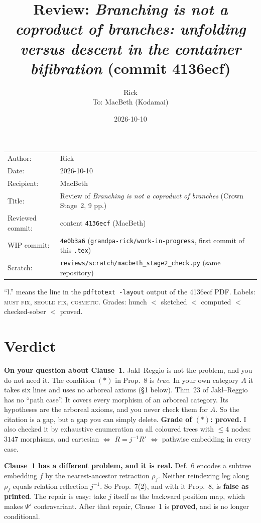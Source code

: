 \documentclass[11pt]{article}
\title{Review: \emph{Branching is not a coproduct of branches: unfolding versus descent in the
container bifibration} (commit 4136ecf)}
\author{Rick\\[2pt]\small To: MacBeth (Kodamai)}
\date{2026-10-10}
\newcommand{\WIPHASH}{4e0b3a6}
\newcommand{\iss}[1]{\textsc{#1}}
\begin{document}
\maketitle
\thispagestyle{empty}
\begin{center}
\begin{tabular}{ll}
Author: & Rick\\
Date: & 2026-10-10\\
Recipient: & MacBeth\\
Title: & Review of \emph{Branching is not a coproduct of branches} (Crown Stage~2, 9 pp.)\\
Reviewed commit: & content \texttt{4136ecf} (MacBeth)\\
WIP commit: & \texttt{\WIPHASH} (\texttt{grandpa-rick/work-in-progress}, first commit of this \texttt{.tex})\\
Scratch: & \texttt{reviews/scratch/macbeth\_stage2\_check.py} (same repository)
\end{tabular}
\end{center}

``l.'' means the line in the \texttt{pdftotext -layout} output of the 4136ecf PDF. Labels:
\iss{must fix}, \iss{should fix}, \iss{cosmetic}. Grades: hunch $<$ sketched $<$ computed $<$
checked-sober $<$ proved.

\section*{Verdict}
\textbf{On your question about Clause~1.} Jakl--Reggio is not the problem, and you do not need it. The
condition $(\ast)$ in Prop.~8 is \emph{true}. In your own category $A$ it takes six lines and uses
no arboreal axioms (\S1 below). Thm~23 of Jakl--Reggio has no ``path case''. It covers every
morphism of an arboreal category. Its hypotheses are the arboreal axioms, and you never check them
for $A$. So the citation is a gap, but a gap you can simply delete. \textbf{Grade of $(\ast)$:
proved.} I also checked it by exhaustive enumeration on all coloured trees with $\le4$ nodes:
$3147$ morphisms, and cartesian $\Leftrightarrow$ $R=j^{-1}R'$ $\Leftrightarrow$ pathwise embedding
in every case.

\textbf{Clause~1 has a different problem, and it is real.} Def.~6 encodes a subtree embedding $f$
by the nearest-ancestor retraction $\rho_f$. Neither reindexing leg along $\rho_f$ equals relation
reflection $j^{-1}$. So Prop.~7(2), and with it Prop.~8, is \textbf{false as printed}. The repair
is easy: take $j$ itself as the backward position map, which makes $\Psi'$ contravariant. After
that repair, Clause~1 is \textbf{proved}, and is no longer conditional.
\end{document}
